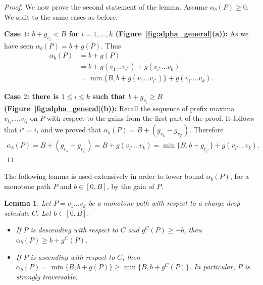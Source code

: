 \documentclass[11pt]{article}
\newtheorem{lemma}[theorem]{Lemma}
\begin{document}
\begin{proof}
    We now prove the second statement of the lemma. Assume $\alpha_b(P) \ge 0$. We split to the same cases as before.

    \textbf{Case $1$: $b + g_{v_i}< B$ for $i=1,\ldots ,k$ (Figure~\ref{fig:alpha_general}(a)):}
    As we have seen $\alpha_b(P) = b + g(P)$. Thus
    \begin{align*}
        \alpha_b(P) &= b + g(P) 
        \\&=  b + g(v_1\ldots v_{i^\star}) + g(v_{i^\star}\ldots v_k) 
        \\&= \min \{B, b + g(v_1\ldots v_{i^\star})\} + g(v_{{i^\star}}\ldots v_k).
    \end{align*}

    \textbf{Case $2$: there is $1\le i \le k$ such that $b + g_{v_i} \ge B$ (Figure~\ref{fig:alpha_general}(b)):} 
    Recall the sequence of prefix maxima $v_{i_1},\ldots v_{i_t}$ on $P$ with respect to the gains from the first part of the proof. It follows that $i^\star = i_t$ and we proved that   $\alpha_b(P) = B + (g_{v_k} - g_{v_{i^\star}})$. Therefore
    \begin{align*}
        \alpha_b(P) = B +(g_{v_k} - g_{v_{i^\star}})
        = B + g(v_{i^\star} \ldots v_k)
        = \min\{B,  b+g_{v_{i^\star}}\} + g(v_{i^\star} \ldots v_k).
    \end{align*}
\end{proof}


The following lemma is used extensively in order to lower bound $\alpha_b(P)$, for a monotone path $P$ and $b\in [0,B]$, by the gain of $P$. 

\begin{lemma}\label{lemma:alpha-of-monotone}
    Let $P=v_1\ldots v_k$ be a monotone path with respect to a charge drop schedule $C$. Let $b\in [0,B]$.
    \begin{itemize}
        \item If $P$ is descending with respect to $C$ and $g^C(P)\ge -b$, then   $\alpha_b(P) \ge b+g^C(P)$.  
        \item If $P$ is ascending with respect to $C$, then  $\alpha_b(P) = \min\{B,b+g(P)\} \ge \min\{B,b+g^C(P)\}$. In particular, $P$ is strongly traversable.
    \end{itemize}
\end{lemma}
\end{document}
